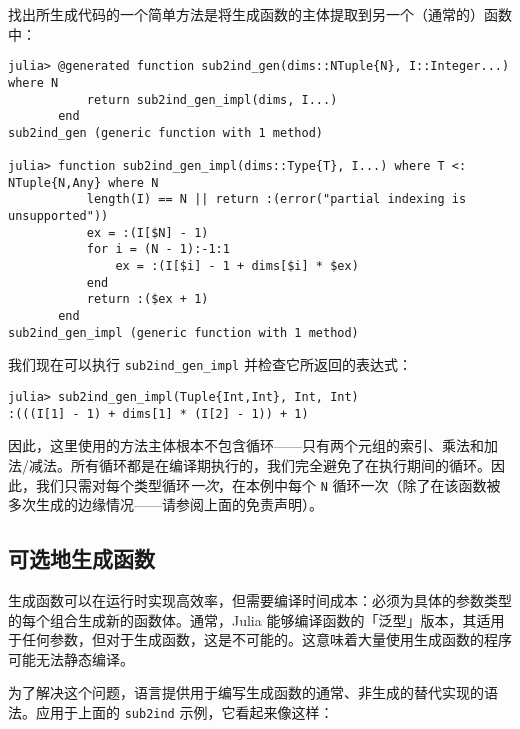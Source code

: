 找出所生成代码的一个简单方法是将生成函数的主体提取到另一个（通常的）函数中：




\begin{verbatim}
julia> @generated function sub2ind_gen(dims::NTuple{N}, I::Integer...) where N
           return sub2ind_gen_impl(dims, I...)
       end
sub2ind_gen (generic function with 1 method)

julia> function sub2ind_gen_impl(dims::Type{T}, I...) where T <: NTuple{N,Any} where N
           length(I) == N || return :(error("partial indexing is unsupported"))
           ex = :(I[$N] - 1)
           for i = (N - 1):-1:1
               ex = :(I[$i] - 1 + dims[$i] * $ex)
           end
           return :($ex + 1)
       end
sub2ind_gen_impl (generic function with 1 method)
\end{verbatim}



我们现在可以执行 \texttt{sub2ind\_gen\_impl} 并检查它所返回的表达式：




\begin{verbatim}
julia> sub2ind_gen_impl(Tuple{Int,Int}, Int, Int)
:(((I[1] - 1) + dims[1] * (I[2] - 1)) + 1)
\end{verbatim}



因此，这里使用的方法主体根本不包含循环——只有两个元组的索引、乘法和加法/减法。所有循环都是在编译期执行的，我们完全避免了在执行期间的循环。因此，我们只需对每个类型循环\emph{一次}，在本例中每个 \texttt{N} 循环一次（除了在该函数被多次生成的边缘情况——请参阅上面的免责声明）。



\hypertarget{2054450996027567500}{}


\subsection{可选地生成函数}



生成函数可以在运行时实现高效率，但需要编译时间成本：必须为具体的参数类型的每个组合生成新的函数体。通常，Julia 能够编译函数的「泛型」版本，其适用于任何参数，但对于生成函数，这是不可能的。这意味着大量使用生成函数的程序可能无法静态编译。



为了解决这个问题，语言提供用于编写生成函数的通常、非生成的替代实现的语法。应用于上面的 \texttt{sub2ind} 示例，它看起来像这样：




